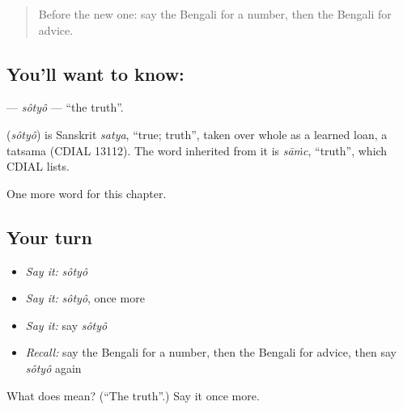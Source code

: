 \begin{quote}
Before the new one: say the Bengali for a number, then the Bengali for advice.
\end{quote}

\subsection*{You'll want to know: }
\textbf{} — \emph{sôtyô} — \textquotedblleft{}the truth\textquotedblright{}.

\begin{cousinweb}
\textbf{} (\emph{sôtyô}) is Sanskrit \emph{satya}, \textquotedblleft{}true; truth\textquotedblright{}, taken over whole as a learned loan, a tatsama (CDIAL 13112). The word inherited from it is \emph{sāṁc}, \textquotedblleft{}truth\textquotedblright{}, which CDIAL lists.
\end{cousinweb}

\begin{grammarlens}[title={What you've built}]
One more word for this chapter.
\end{grammarlens}

\subsection*{Your turn}
\begin{itemize}
\raggedright
  \item \emph{Say it:} \emph{sôtyô}
  \item \emph{Say it:} \emph{sôtyô}, once more
  \item \emph{Say it:} say \emph{sôtyô}
  \item \emph{Recall:} say the Bengali for a number, then the Bengali for advice, then say \emph{sôtyô} again
\end{itemize}

\begin{tcolorbox}[breakable,colback=teal!4,colframe=teal!35!black,title={Before you move on}]
What does  mean? (\textquotedblleft{}The truth\textquotedblright{}.) Say it once more.
\end{tcolorbox}
